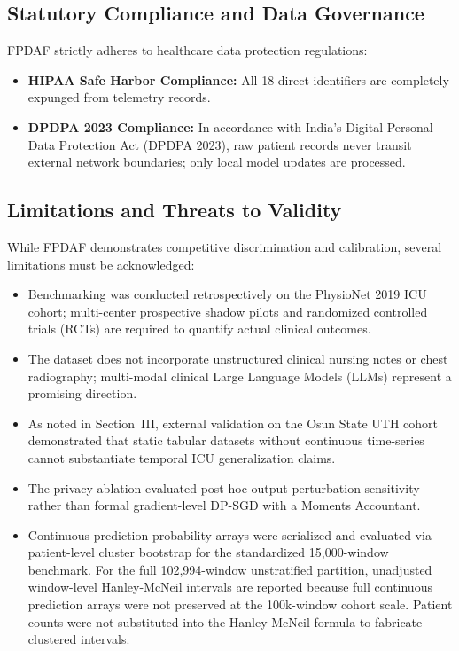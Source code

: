 \documentclass[journal,twocolumn,10pt]{IEEEtran}
\begin{document}
\subsection{Statutory Compliance and Data Governance}
FPDAF strictly adheres to healthcare data protection regulations:
\begin{itemize}
    \item \textbf{HIPAA Safe Harbor Compliance:} All 18 direct identifiers are completely expunged from telemetry records.
    \item \textbf{DPDPA 2023 Compliance:} In accordance with India's Digital Personal Data Protection Act (DPDPA 2023), raw patient records never transit external network boundaries; only local model updates are processed.
\end{itemize}

\subsection{Limitations and Threats to Validity}
While FPDAF demonstrates competitive discrimination and calibration, several limitations must be acknowledged:
\begin{itemize}
    \item Benchmarking was conducted retrospectively on the PhysioNet 2019 ICU cohort; multi-center prospective shadow pilots and randomized controlled trials (RCTs) are required to quantify actual clinical outcomes.
    \item The dataset does not incorporate unstructured clinical nursing notes or chest radiography; multi-modal clinical Large Language Models (LLMs) represent a promising direction.
    \item As noted in Section~III, external validation on the Osun State UTH cohort demonstrated that static tabular datasets without continuous time-series cannot substantiate temporal ICU generalization claims.
    \item The privacy ablation evaluated post-hoc output perturbation sensitivity rather than formal gradient-level DP-SGD with a Moments Accountant.
    \item Continuous prediction probability arrays were serialized and evaluated via patient-level cluster bootstrap for the standardized 15,000-window benchmark. For the full 102,994-window unstratified partition, unadjusted window-level Hanley-McNeil intervals are reported because full continuous prediction arrays were not preserved at the 100k-window cohort scale. Patient counts were not substituted into the Hanley-McNeil formula to fabricate clustered intervals.
\end{itemize}
\end{document}
